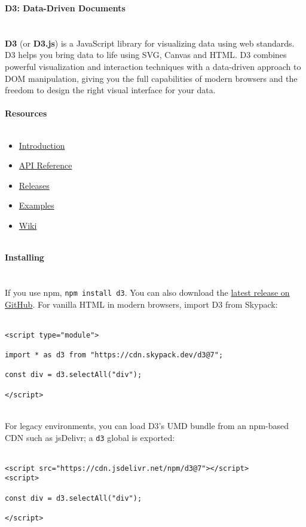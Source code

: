 \documentclass{article}
\begin{document}
{\noindent \Huge \textbf{D3: Data-Driven Documents}}\\\\
\\
\textbf{D3} (or \textbf{D3.js}) is a JavaScript library for visualizing data using web standards. D3 helps you bring data to life using SVG, Canvas and HTML. D3 combines powerful visualization and interaction techniques with a data-driven approach to DOM manipulation, giving you the full capabilities of modern browsers and the freedom to design the right visual interface for your data.\\
\\
{\noindent \LARGE \textbf{Resources}}\\\\
\begin{itemize}
	\item \href{https://observablehq.com/@d3/learn-d3}{Introduction}
	\item \href{https://github.com/d3/d3/blob/main/API.md}{API Reference}
	\item \href{https://github.com/d3/d3/releases}{Releases}
	\item \href{https://observablehq.com/@d3/gallery}{Examples}
	\item \href{https://github.com/d3/d3/wiki}{Wiki}
\end{itemize}
\\
{\noindent \LARGE \textbf{Installing}}\\\\
\\
If you use npm, \verb|npm install d3|. You can also download the \href{https://github.com/d3/d3/releases/latest}{latest release on GitHub}. For vanilla HTML in modern browsers, import D3 from Skypack:\\
\\
\begin{lstlisting}
<script type="module">

import * as d3 from "https://cdn.skypack.dev/d3@7";

const div = d3.selectAll("div");

</script>
\end{lstlisting}
\\
For legacy environments, you can load D3’s UMD bundle from an npm-based CDN such as jsDelivr; a \verb|d3| global is exported:\\
\\
\begin{lstlisting}
<script src="https://cdn.jsdelivr.net/npm/d3@7"></script>
<script>

const div = d3.selectAll("div");

</script>
\end{lstlisting}
\end{document}
